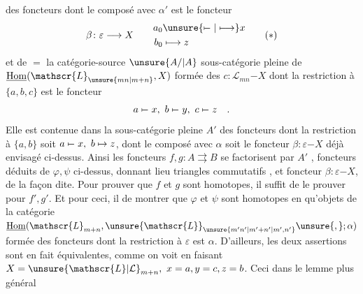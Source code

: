 des foncteurs  dont le composé avec $\alpha'$ est le foncteur
\[
\beta\colon\varepsilon\longrightarrow X\qquad
\begin{aligned}a_0&\unsure{\mathrel{\mapstochar\relbar}|\longmapsto} x\\ b_0&\longmapsto z\end{aligned}
\tag*{$(*)$}
\]
et de $=$ la catégorie-source $\unsure{A/|A}$  
sous-catégorie pleine de $\underline{\mathrm{Hom}}(\mathscr{L}_{\unsure{mn|m+n}},X)$ formée
des $c\colon\mathscr{L}_{mn}\mathord{-}X$ dont la restriction à
$\{a,b,c\}$ est le foncteur
\[
a\mathrel{\mapstochar\relbar}x,\ b\mathrel{\mapstochar\relbar}y,\ c\mathrel{\mapstochar\relbar}z\quad .
\]
Elle est contenue dans la sous-catégorie pleine
$A'$ des foncteurs dont la restriction à $\{a,b\}$ soit
$a\mathrel{\mapstochar\relbar}x,\ b\mapsto z$,  dont le composé avec $\alpha$ soit
le foncteur $\beta\colon\varepsilon\mathord{-}X$ déjà envisagé ci-dessus.
Ainsi les foncteurs $f,g\colon A\rightrightarrows B$ se factorisent
par $A'$
,
foncteurs déduits de $\varphi,\psi$ ci-dessus, donnant
lieu  triangles commutatifs , et  foncteur
 $\beta\colon\varepsilon\mathord{-}X$, de la façon dite. Pour
prouver que $f$ et $g$ sont homotopes, il suffit
de le prouver pour $f',g'$. Et pour ceci, il
  de montrer que $\varphi$ et $\psi$
sont homotopes en  qu'objets de la
catégorie $\underline{\mathrm{Hom}}(\mathscr{L}_{m+n},\unsure{\mathscr{L}}_{\unsure{m'n'|m'+n'|m',n'}}\unsure{,};\alpha)$ formée
des foncteurs dont la restriction à $\varepsilon$ est $\alpha$.
D'ailleurs, les deux assertions  sont en fait équivalentes,
comme on voit en faisant $X=\unsure{\mathscr{L}|\mathcal{L}}_{m+n},\ x=a,y=c,z=b$.
Ceci  dans le lemme  plus général

